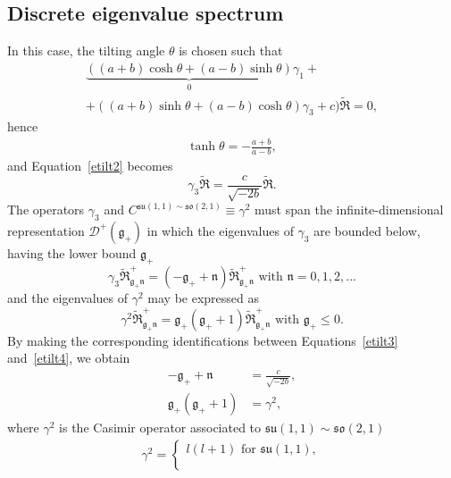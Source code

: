 \documentclass[12pt,a4paper]{report}
\theoremstyle{definition}
\theoremstyle{remark}
\theoremstyle{remark}
\begin{document}
\begin{appendices}
\subsection{Discrete eigenvalue spectrum}\label{tiltingdiscrete}
In this case, the tilting angle $\theta$ is chosen such that
\begin{align*}
\underbrace{((a+b)\cosh\theta+(a-b)\sinh\theta)}_{0}\gamma_1+\\+((a+b)\sinh\theta
+(a-b)\cosh\theta)\gamma_3+c)\widetilde{\mathfrak{R}}=0,
\end{align*}
hence
\begin{align*}
\tanh\theta=-\frac{a+b}{a-b},
\end{align*}
and Equation~\ref{etilt2} becomes
\begin{equation}\label{etilt3}
\gamma_3\widetilde{\mathfrak{R}}=\frac{c}{\sqrt{-2b}}\widetilde{\mathfrak{R}}.
\end{equation}
The operators $\gamma_3$ and $C^{\mathfrak{su}(1,1)\sim\mathfrak{so}(2,1)}\equiv\gamma^2$ must span the infinite-dimensional representation $\mathcal{D}^+(\mathfrak{g}_+)$ in which the eigenvalues of $\gamma_3$ are bounded below, having the lower bound $\mathfrak{g}_+$
\begin{equation}\label{etilt4}
\gamma_3\widetilde{\mathfrak{R}}^+_{\mathfrak{g}_+\mathfrak{n}}=(-\mathfrak{g}_++\mathfrak{n})\widetilde{\mathfrak{R}}^+_{\mathfrak{g}_+\mathfrak{n}} \text{ with }\mathfrak{n}=0,1,2,...
\end{equation}
and the eigenvalues of $\gamma^2$ may be expressed as
\begin{equation}\label{etilt5}
\gamma^2\widetilde{\mathfrak{R}}^+_{\mathfrak{g}_+\mathfrak{n}}=\mathfrak{g}_+(\mathfrak{g}_++1)\widetilde{\mathfrak{R}}^+_{\mathfrak{g}_+\mathfrak{n}} \text{ with }\mathfrak{g}_+ \leq 0.
\end{equation}
By making the corresponding identifications between Equations~\ref{etilt3} and~\ref{etilt4}, we obtain
\begin{align*}
-\mathfrak{g}_++\mathfrak{n}&=\frac{c}{\sqrt{-2b}}, \\
\mathfrak{g}_+(\mathfrak{g}_++1)&=\gamma^2,
\end{align*}
where $\gamma^2$ is the Casimir operator associated to $\mathfrak{su}(1,1)\sim\mathfrak{so}(2,1)$
\begin{align}\label{etilt9}
\gamma^2=\left\{
\begin{array}{ll}
l(l+1) \text{ for } \mathfrak{su}(1,1),\\ \\

\end{array}
\end{align}
\end{appendices}
\end{document}
